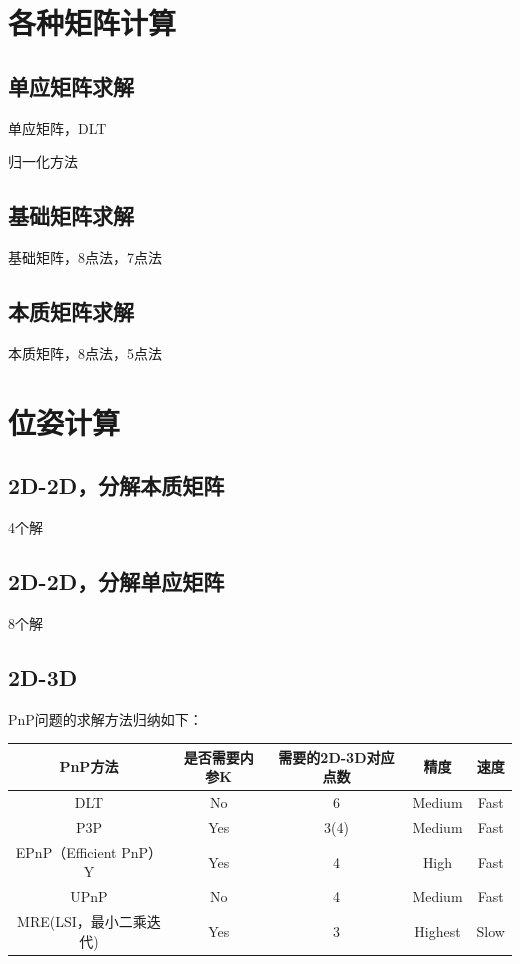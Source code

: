 \section{各种矩阵计算}

\subsection{单应矩阵求解}
单应矩阵，DLT

归一化方法
\subsection{基础矩阵求解}
基础矩阵，8点法，7点法
\subsection{本质矩阵求解}

本质矩阵，8点法，5点法

\section{位姿计算}
\subsection{2D-2D，分解本质矩阵}
4个解
\subsection{2D-2D，分解单应矩阵}
8个解



\subsection{2D-3D}

PnP问题的求解方法归纳如下：
~\\ %

\begin{tabular}{|c|c|c|c|c|}
	\hline
	PnP方法 & 是否需要内参K & 需要的2D-3D对应点数 & 精度 & 速度 \\
	\hline
	DLT & No & 6 & Medium & Fast   \\
	P3P& Yes & 3(4)& Medium & Fast \\
	EPnP（Efficient PnP）Y& Yes & 4 & High & Fast   \\
	UPnP & No & 4 & Medium & Fast  \\
	MRE(LSI，最小二乘迭代) & Yes & 3 & Highest & Slow \\
	\hline
\end{tabular}

